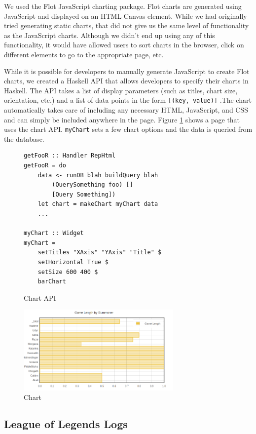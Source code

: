 \documentclass[letterpaper,twocolumn,9pt]{article}
\newcommand{\code}[1]{\texttt{#1}}
\begin{document}
We used the Flot JavaScript charting package. Flot charts are generated using JavaScript and displayed on an HTML Canvas element. While we had originally tried generating static charts, that did not give us the same level of functionality as the JavaScript charts. Although we didn't end up using any of this functionality, it would have allowed users to sort charts in the browser, click on different elements to go to the appropriate page, etc.

While it is possible for developers to manually generate JavaScript to create Flot charts, we created a Haskell API that allows developers to specify their charts in Haskell. The API takes a list of display parameters (such as titles, chart size, orientation, etc.) and a list of data points in the form \code{[(key, value)]} .The chart automatically takes care of including any necessary HTML, JavaScript, and CSS and can simply be included anywhere in the page. Figure \ref{chartcode} shows a page that uses the chart API. \code{myChart} sets a few chart options and the data is queried from the database.

\begin{figure}[]
\footnotesize{
\begin{verbatim}
getFooR :: Handler RepHtml
getFooR = do
    data <- runDB blah buildQuery blah
        (QuerySomething foo) []
        [Query Something])
    let chart = makeChart myChart data
    ...

myChart :: Widget
myChart =
    setTitles "XAxis" "YAxis" "Title" $
    setHorizontal True $
    setSize 600 400 $
    barChart
\end{verbatim}
}
    \caption{Chart API}
    \label{chartcode}
\end{figure}

\begin{figure}[h]
    \includegraphics[width=80mm]{imgs/chart.png}
    \caption{Chart}
    \label{chart}
\end{figure}

\subsection{League of Legends Logs}
\end{document}

